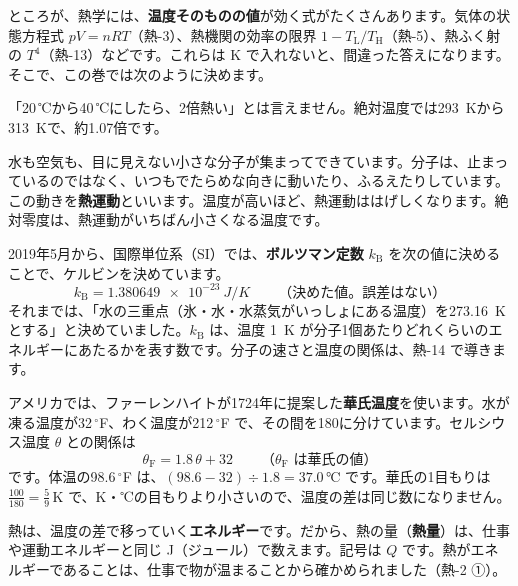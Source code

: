 ところが、熱学には、\textbf{温度そのものの値}が効く式がたくさんあります。気体の状態方程式 $pV=nRT$（熱-3）、熱機関の効率の限界 $1-T_{\mathrm L}/T_{\mathrm H}$（熱-5）、熱ふく射の $T^4$（熱-13）などです。これらは K で入れないと、間違った答えになります。そこで、この巻では次のように決めます。
\begin{bkcenter}
\end{bkcenter}
「20\,℃から40\,℃にしたら、2倍熱い」とは言えません。絶対温度では\qty{293}{K}から\qty{313}{K}で、約1.07倍です。

水も空気も、目に見えない小さな分子が集まってできています。分子は、止まっているのではなく、いつもでたらめな向きに動いたり、ふるえたりしています。この動きを\textbf{熱運動}といいます。温度が高いほど、熱運動ははげしくなります。絶対零度は、熱運動がいちばん小さくなる温度です。

2019年5月から、国際単位系（SI）では、\textbf{ボルツマン定数} $k_{\mathrm B}$ を次の値に決めることで、ケルビンを決めています。
\[k_{\mathrm B}=\qty{1.380649e-23}{J/K}\qquad\text{（決めた値。誤差はない）}\]
それまでは、「水の三重点（氷・水・水蒸気がいっしょにある温度）を\qty{273.16}{K}とする」と決めていました。$k_{\mathrm B}$ は、温度 \qty{1}{K} が分子1個あたりどれくらいのエネルギーにあたるかを表す数です。分子の速さと温度の関係は、熱-14 で導きます。

\begin{seikaku}
アメリカでは、ファーレンハイトが1724年に提案した\textbf{華氏温度}を使います。水が凍る温度が32\,$^{\circ}$F、わく温度が212\,$^{\circ}$F で、その間を180に分けています。セルシウス温度 $\theta$ との関係は
\[\theta_{\mathrm F}=1.8\,\theta+32\qquad\text{（$\theta_{\mathrm F}$ は華氏の値）}\]
です。体温の98.6\,$^{\circ}$F は、$(98.6-32)\div1.8=37.0\,℃$ です。華氏の1目もりは $\tfrac{100}{180}=\tfrac{5}{9}$\,K で、K・℃の目もりより小さいので、温度の差は同じ数になりません。
\end{seikaku}

\label{ph:熱-1:sec3}
熱は、温度の差で移っていく\textbf{エネルギー}です。だから、熱の量（\textbf{熱量}）は、仕事や運動エネルギーと同じ J（ジュール）で数えます。記号は $Q$ です。熱がエネルギーであることは、仕事で物が温まることから確かめられました（熱-2 ①）。

